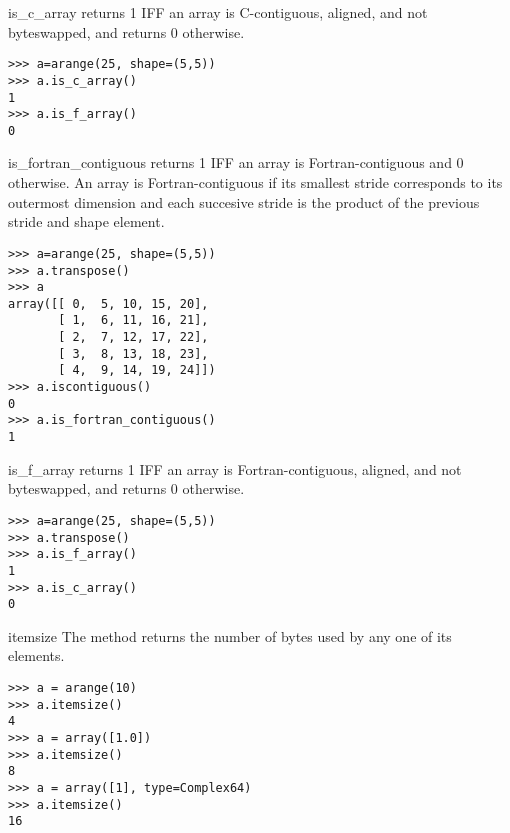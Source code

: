 \begin{methoddesc}[numarray]{is_c_array}{}
   \label{arraymethod:is-c-array} 
    returns 1 IFF an array is C-contiguous, aligned, and
   not byteswapped, and returns 0 otherwise.
\begin{verbatim}
>>> a=arange(25, shape=(5,5))
>>> a.is_c_array()
1
>>> a.is_f_array()
0
\end{verbatim}
\end{methoddesc}


\begin{methoddesc}[numarray]{is_fortran_contiguous}{}
   \label{arraymethod:is-fortran-contiguous} 
    returns 1 IFF an array is Fortran-contiguous
   and 0 otherwise.  An array is Fortran-contiguous if its smallest stride
   corresponds to its outermost dimension and each succesive stride is the
   product of the previous stride and shape element.
\begin{verbatim}
>>> a=arange(25, shape=(5,5))
>>> a.transpose()
>>> a
array([[ 0,  5, 10, 15, 20],
       [ 1,  6, 11, 16, 21],
       [ 2,  7, 12, 17, 22],
       [ 3,  8, 13, 18, 23],
       [ 4,  9, 14, 19, 24]])
>>> a.iscontiguous()
0
>>> a.is_fortran_contiguous()
1
\end{verbatim}
\end{methoddesc}


\begin{methoddesc}[numarray]{is_f_array}{}
   \label{arraymethod:is-f-array}  returns 1 IFF
   an array is Fortran-contiguous, aligned, and not byteswapped, and returns 0
   otherwise.
\begin{verbatim}
>>> a=arange(25, shape=(5,5))
>>> a.transpose()
>>> a.is_f_array()
1
>>> a.is_c_array()
0
\end{verbatim}
\end{methoddesc}


\begin{methoddesc}[numarray]{itemsize}{}
  \label{arraymethod:itemsize} The  method 
  returns the number of bytes used by any one of its elements.
\begin{verbatim}
>>> a = arange(10)
>>> a.itemsize()
4
>>> a = array([1.0])
>>> a.itemsize()
8
>>> a = array([1], type=Complex64)
>>> a.itemsize()
16
\end{verbatim}
\end{methoddesc}


